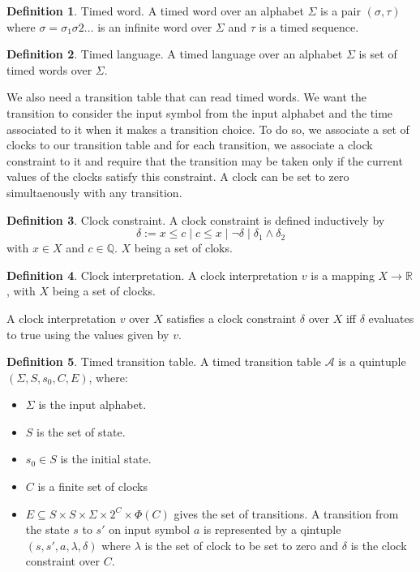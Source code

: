 \documentclass[12pt]{article}
\theoremstyle{definition}
\newtheorem{definition}{Definition}[section]
\theoremstyle{definition}
\newcommand{\R}{\mathbb{R}}
\newcommand{\Q}{\mathbb{Q}}
\newcommand{\A}{\mathcal{A}}
\begin{document}
\theoremstyle{definition}
\begin{definition}{Timed word.}
A timed word over an alphabet $\Sigma$ is a pair $(\sigma, \tau)$ where $\sigma = \sigma_1 \sigma2 ...$ is an infinite word over $\Sigma$ and $\tau$ is a timed sequence.
\end{definition}

\theoremstyle{definition}
\begin{definition}{Timed language.}
A timed language over an alphabet $\Sigma$ is set of timed words over $\Sigma$.
\end{definition}

We also need a transition table that can read timed words. We want the transition to consider the input symbol from the input alphabet and the time associated to it when it makes a transition choice. To do so, we associate a set of clocks to our transition table and for each transition, we associate a clock constraint to it and require that the transition may be taken only if the current values of the clocks satisfy this constraint. A clock can be set to zero simultaenously with any transition.

\theoremstyle{definition}
\begin{definition}{Clock constraint.} A clock constraint is defined inductively by
$$\delta := x \le c \mid c \le x \mid \neg \delta \mid \delta_1 \land \delta_2$$ with $x \in X$ and $c \in \Q$. $X$ being a set of cloks.
\end{definition}

\theoremstyle{definition}
\begin{definition}{Clock interpretation.} A clock interpretation $v$ is a mapping $X \to \R$, with $X$ being a set of clocks.
\end{definition}

A clock interpretation $v$ over $X$ satisfies a clock constraint $\delta$ over $X$ iff $\delta$ evaluates to true using the values given by $v$.

\theoremstyle{definition}
\begin{definition}{Timed transition table.} A timed transition table $\A$ is a quintuple $(\Sigma, S, s_{0},C, E)$, where:
\begin{itemize}
\item $\Sigma$ is the input alphabet.
\item $S$ is the set of state.
\item $s_{0} \in S$ is the initial state.
\item $C$ is a finite set of clocks
\item $E \subseteq S \times S \times \Sigma \times 2^{C} \times \Phi(C)$ gives the set of transitions. A transition from the state $s$ to $s'$ on input symbol $a$ is represented by a qintuple $(s, s', a, \lambda, \delta)$ where $\lambda$ is the set of clock to be set to zero and $\delta$ is the clock constraint over $C$.
\end{itemize}
\end{definition}
\end{document}

